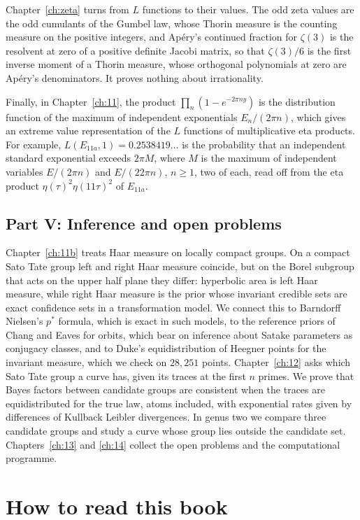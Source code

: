 Chapter~\ref{ch:zeta} turns from $L$ functions to their values. The odd zeta values are the odd cumulants of the Gumbel law, whose Thorin measure is the counting measure on the positive integers, and Ap\'ery's continued fraction for $\zeta(3)$ is the resolvent at zero of a positive definite Jacobi matrix, so that $\zeta(3)/6$ is the first inverse moment of a Thorin measure, whose orthogonal polynomials at zero are Ap\'ery's denominators. It proves nothing about irrationality.


Finally, in Chapter~\ref{ch:11}, the product $\prod_n(1-e^{-2\pi ny})$ is the distribution function of the maximum of independent exponentials $E_n/(2\pi n)$, which gives an extreme value representation of the $L$ functions of multiplicative eta products. For example, $L(E_{11a},1)=0.2538419\ldots$ is the probability that an independent standard exponential exceeds $2\pi M$, where $M$ is the maximum of independent variables $E/(2\pi n)$ and $E/(22\pi n)$, $n\ge1$, two of each, read off from the eta product $\eta(\tau)^2\eta(11\tau)^2$ of $E_{11a}$.

\subsection{Part V: Inference and open problems}
Chapter~\ref{ch:11b} treats Haar measure on locally compact groups. On a compact Sato Tate group left and right Haar measure coincide, but on the Borel subgroup that acts on the upper half plane they differ: hyperbolic area is left Haar measure, while right Haar measure is the prior whose invariant credible sets are exact confidence sets in a transformation model. We connect this to Barndorff Nielsen's $p^*$ formula, which is exact in such models, to the reference priors of Chang and Eaves for orbits, which bear on inference about Satake parameters as conjugacy classes, and to Duke's equidistribution of Heegner points for the invariant measure, which we check on $28{,}251$ points. Chapter~\ref{ch:12} asks which Sato Tate group a curve has, given its traces at the first $n$ primes. We prove that Bayes factors between candidate groups are consistent when the traces are equidistributed for the true law, atoms included, with exponential rates given by differences of Kullback Leibler divergences. In genus two we compare three candidate groups and study a curve whose group lies outside the candidate set. Chapters~\ref{ch:13} and \ref{ch:14} collect the open problems and the computational programme.

\section{How to read this book}

